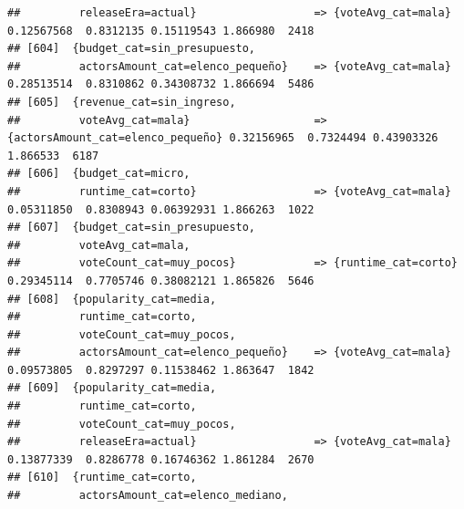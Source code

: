 \documentclass[
]{article}
\begin{document}
\begin{verbatim}
##         releaseEra=actual}                  => {voteAvg_cat=mala}                0.12567568  0.8312135 0.15119543 1.866980  2418
## [604]  {budget_cat=sin_presupuesto,                                                                                             
##         actorsAmount_cat=elenco_pequeño}    => {voteAvg_cat=mala}                0.28513514  0.8310862 0.34308732 1.866694  5486
## [605]  {revenue_cat=sin_ingreso,                                                                                                
##         voteAvg_cat=mala}                   => {actorsAmount_cat=elenco_pequeño} 0.32156965  0.7324494 0.43903326 1.866533  6187
## [606]  {budget_cat=micro,                                                                                                       
##         runtime_cat=corto}                  => {voteAvg_cat=mala}                0.05311850  0.8308943 0.06392931 1.866263  1022
## [607]  {budget_cat=sin_presupuesto,                                                                                             
##         voteAvg_cat=mala,                                                                                                       
##         voteCount_cat=muy_pocos}            => {runtime_cat=corto}               0.29345114  0.7705746 0.38082121 1.865826  5646
## [608]  {popularity_cat=media,                                                                                                   
##         runtime_cat=corto,                                                                                                      
##         voteCount_cat=muy_pocos,                                                                                                
##         actorsAmount_cat=elenco_pequeño}    => {voteAvg_cat=mala}                0.09573805  0.8297297 0.11538462 1.863647  1842
## [609]  {popularity_cat=media,                                                                                                   
##         runtime_cat=corto,                                                                                                      
##         voteCount_cat=muy_pocos,                                                                                                
##         releaseEra=actual}                  => {voteAvg_cat=mala}                0.13877339  0.8286778 0.16746362 1.861284  2670
## [610]  {runtime_cat=corto,                                                                                                      
##         actorsAmount_cat=elenco_mediano,                                                                                        

\end{verbatim}
\end{document}
